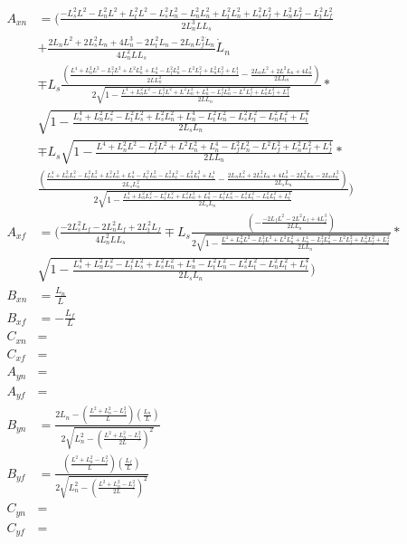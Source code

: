 \documentclass[11pt, landscape]{article}
\begin{document}
\begin{align}
  A_{xn} &= \Bigg(\frac{-L_s^2L^2 - L_n^2L^2 + L_t^2L^2 - L_s^2L_{n}^2 - L_n^2L_{n}^2 + L_t^2L_{n}^2 + L_s^2L_{f}^2 + L_n^2L_{f}^2 - L_t^2L_{f}^2}{{2L_n^{3}LL_s}}\\
  &+ \frac{2L_nL^2 + 2L_s^2L_{n} + 4L_n^3 - 2L_t^2L_{n} - 2L_nL_{f}^2\dot{L}_n}{4L_n^2LL_s}\dot{L}_n\\
  &\mp L_s\frac{\left(\frac{L^4 + L_n^2L^2 - L_f^2L^2 + L^2L_{n}^2 + L_{n}^4 - L_f^2L_{n}^2 - L^2L_{f}^2 + L_n^2L_{f}^2 + L_{f}^4}{2LL^2_{n}} - \frac{2L_nL^2 + 2L^2L_{n} + 4L_{n}^3}{2LL_{n}}\right)}{2\sqrt{1-\frac{L^4 + L_n^2L^2 - L_f^2L^2 + L^2L_{n}^2 + L_{n}^4 - L_f^2L_{n}^2 - L^2L_{f}^2 + L_n^2L_{f}^2 + L_{f}^4}{2LL_{n}}}}*\\
  &\sqrt{1-\frac{L_{s}^4 + L_n^2L_{s}^2 - L_t^2L_{s}^2 + L_s^2L_{n}^2 + L_{n}^4 - L_t^2L_{n}^2 - L_s^2L_{t}^2 - L_n^2L_{t}^2 + L_{t}^4}{2L_{s}L_{n}}}\\
  &\mp L_s\sqrt{1-\frac{L^4 + L_n^2L^2 - L_f^2L^2 + L^2L_{n}^2 + L_{n}^4 - L_f^2L_{n}^2 - L^2L_{f}^2 + L_n^2L_{f}^2 + L_{f}^4}{2LL_{n}}}*\\
  &\frac{\left(\frac{L_{s}^4 + L_n^2L_{s}^2 - L_t^2L_{s}^2 + L_s^2L_{n}^2 + L_{n}^4 - L_t^2L_{n}^2 - L_s^2L_{t}^2 - L_n^2L_{t}^2 + L_{t}^4}{2L_{s}L^2_{n}}
    - \frac{2L_nL_{s}^2 + 2L_s^2L_{n} + 4L_{n}^3 - 2L_t^2L_{n} - 2L_nL_{t}^2}{2L_{s}L_{n}}\right)}{2\sqrt{1-\frac{L_{s}^4 + L_n^2L_{s}^2 - L_t^2L_{s}^2 + L_s^2L_{n}^2 + L_{n}^4 - L_t^2L_{n}^2 - L_s^2L_{t}^2 - L_n^2L_{t}^2 + L_{t}^4}{2L_{s}L_{n}}}}\Bigg)\\
  A_{xf} &= \Bigg(\frac{-2L_s^2L_{f} - 2L_n^2L_{f} + 2L_t^2L_{f}}{4L_n^2LL_s} \mp L_s\frac{\left(-\frac{-2L_fL^2 - 2L^2L_{f} + 4L_{f}^3}{2LL_{n}}\right)}{2\sqrt{1-\frac{L^4 + L_n^2L^2 - L_f^2L^2 + L^2L_{n}^2 + L_{n}^4 - L_f^2L_{n}^2 - L^2L_{f}^2 + L_n^2L_{f}^2 + L_{f}^4}{2LL_{n}}}}*\\
  &\sqrt{1-\frac{L_{s}^4 + L_n^2L_{s}^2 - L_t^2L_{s}^2 + L_s^2L_{n}^2 + L_{n}^4 - L_t^2L_{n}^2 - L_s^2L_{t}^2 - L_n^2L_{t}^2 + L_{t}^4}{2L_{s}L_{n}}}\Bigg)\\
  B_{xn} &= \frac{L_n}{L}\\
  B_{xf} &= -\frac{L_f}{L}\\
  C_{xn} &= \\
  C_{xf} &= \\
  A_{yn} &= \\
  A_{yf} &= \\
  B_{yn} &= \frac{2L_n - \left(\frac{L^2+L_n^2-L_f^2}{L}\right)\left(\frac{L_n}{L}\right)}{2\sqrt{L_n^2 - \left(\frac{L^2+L_n^2-L_f^2}{2L}\right)^2}}\\
  B_{yf} &= \frac{\left(\frac{L^2+L_n^2-L_f^2}{L}\right)\left(\frac{L_f}{L}\right)}{2\sqrt{L_n^2 - \left(\frac{L^2+L_n^2-L_f^2}{2L}\right)^2}}\\
  C_{yn} &= \\
  C_{yf} &= \\
\end{align}
\end{document}
